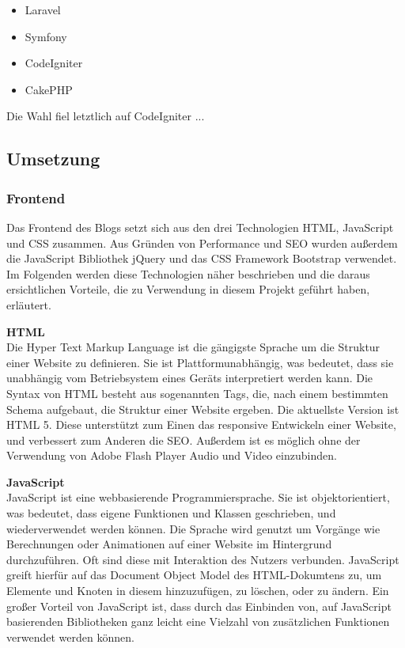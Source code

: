     \begin{itemize}
      \item Laravel
      \item Symfony
      \item CodeIgniter
      \item CakePHP
    \end{itemize}

    Die Wahl fiel letztlich auf CodeIgniter ...

  \subsection{Umsetzung}

    \subsubsection{Frontend}
    Das Frontend des Blogs setzt sich aus den drei Technologien HTML, JavaScript und CSS zusammen. Aus Gründen von Performance und SEO wurden außerdem
    die JavaScript Bibliothek jQuery und das CSS Framework Bootstrap verwendet. Im Folgenden werden diese Technologien näher beschrieben und die daraus
    ersichtlichen Vorteile, die zu Verwendung in diesem Projekt geführt haben, erläutert.

    \textbf{HTML}\\
    {Die Hyper Text Markup Language\cite{html}} ist die gängigste Sprache um die Struktur einer Website zu definieren. Sie ist Plattformunabhängig, was bedeutet,
    dass sie unabhängig vom Betriebsystem eines Geräts interpretiert werden kann. Die Syntax von HTML besteht aus sogenannten Tags, die, nach einem
    bestimmten Schema aufgebaut, die Struktur einer Website ergeben. Die aktuellste Version ist HTML 5. Diese unterstützt zum Einen das responsive
    Entwickeln einer Website, und verbessert zum Anderen die SEO. Außerdem ist es möglich ohne der Verwendung von Adobe Flash Player Audio und Video einzubinden.

    \textbf{JavaScript}\\
    {JavaScript\cite{javascript}} ist eine webbasierende Programmiersprache. Sie ist objektorientiert, was bedeutet, dass eigene Funktionen und Klassen geschrieben, und wiederverwendet
    werden können. Die Sprache wird genutzt um Vorgänge wie Berechnungen oder Animationen auf einer Website im Hintergrund durchzuführen. Oft sind diese mit Interaktion
    des Nutzers verbunden. JavaScript greift hierfür auf das Document Object Model des HTML-Dokumtens zu, um Elemente und Knoten in diesem hinzuzufügen, zu löschen, oder
    zu ändern. Ein großer Vorteil von JavaScript ist, dass durch das Einbinden von, auf JavaScript basierenden Bibliotheken ganz leicht eine Vielzahl von zusätzlichen Funktionen
    verwendet werden können.

